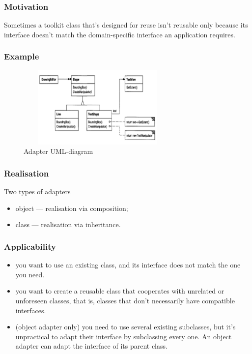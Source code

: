 \documentclass[10pt,xcolor={usenames,dvipsnames}]{beamer}
\begin{document}
\begin{frame}[fragile]
	\frametitle{Motivation}
	\begin{exampleblock}{}
Sometimes a toolkit class that's designed for reuse isn't reusable only because its
interface doesn't match the domain-specific interface an application requires.
	\end{exampleblock}

\end{frame}

\begin{frame}[fragile]
	\frametitle{Example}
	\begin{figure}
		\includegraphics[height=4cm,width=8cm]{adapter.png}
		\caption{Adapter UML-diagram}
	\end{figure}
\end{frame}

\begin{frame}[fragile]
	\frametitle{Realisation}
	\begin{exampleblock}{Two types of adapters}
		\begin{itemize}
		\item object --- realisation  via composition;
		\item class --- realisation via inheritance.
		\end{itemize}
	\end{exampleblock}
\end{frame}

\begin{frame}[fragile]
	\frametitle{Applicability}
	\begin{exampleblock}{}
		\begin{itemize}
			\item you want to use an existing class, and its interface does not match the one
you need.
\item you want to create a reusable class that cooperates with unrelated or
	unforeseen classes, that is, classes that don't necessarily have compatible interfaces.
\item (object adapter only) you need to use several existing subclasses, but it's
	unpractical to adapt their interface by subclassing every one. An object adapter
	can adapt the interface of its parent class.
	\end{itemize}
	\end{exampleblock}
\end{frame}
\end{document}
